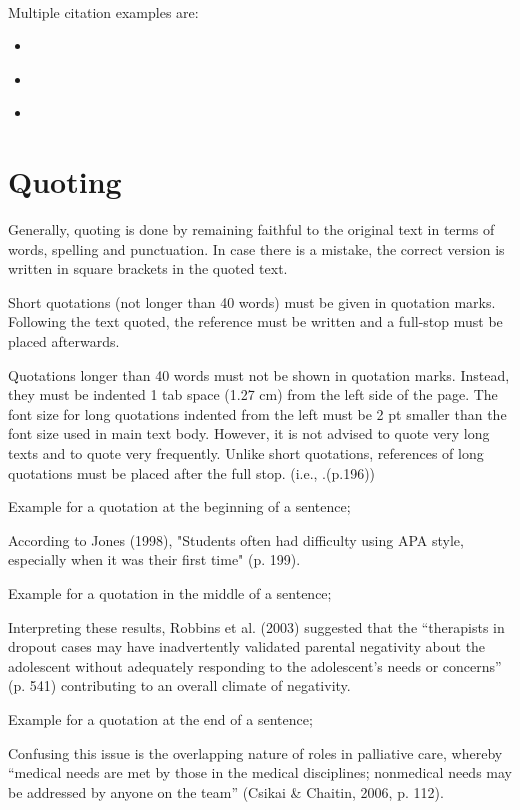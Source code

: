 \vfill\phantom{.}\\

Multiple citation examples are:

\begin{itemize}
    \item \cite{Burke74,17590413,Wegener2000629}
    \item \parencite{Burke74,17590413,Wegener2000629}
    \item \textcite{Burke74,17590413,Wegener2000629}
  \end{itemize}

\section{Quoting}

Generally, quoting is done by remaining faithful to the original text in terms of words, spelling and punctuation. In case there is a mistake, the correct version is written in square brackets in the quoted text.

Short quotations (not longer than 40 words) must be given in quotation marks. Following the text quoted, the reference must be written and a full-stop must be placed afterwards.  

Quotations longer than 40 words must not be shown in quotation  marks. Instead, they must be indented 1 tab space (1.27 cm) from the left side of the page. The font size for long quotations indented from the left must be 2 pt smaller than the font size used in main text body. However, it is not advised to quote very long texts and to quote very frequently. Unlike short quotations, references of long quotations must be placed after the full stop. (i.e., .(p.196))

Example for a quotation at the beginning of a sentence;

According to Jones (1998), "Students often had difficulty using APA style,  especially when it was their first time" (p. 199).

Example for a quotation in the middle of a sentence;

Interpreting these results, Robbins et al. (2003) suggested that the “therapists in dropout cases may have inadvertently validated parental negativity about the adolescent without adequately responding to the adolescent’s needs or concerns” (p. 541) contributing to an overall climate of negativity.

Example for a quotation at the end of a sentence;

Confusing this issue is the overlapping nature of roles in palliative care, whereby “medical needs are met by those in the medical disciplines; nonmedical needs may be addressed by anyone on the team” (Csikai \& Chaitin, 2006, p. 112). 

